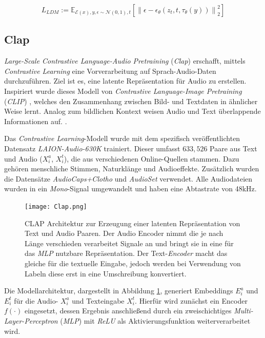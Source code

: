 \documentclass[
  a4paper,  %
  twoside,  %
  bibliography=totoc,
  headsepline,
  cleardoublepage=empty,
  parskip=half,
  draft=false
]{scrbook}
\begin{document}
\begin{equation}
L_{L D M}:=\mathbb{E}_{\mathcal{E}(x), y, \epsilon \sim \mathcal{N}(0,1), t}\left[\left\|\epsilon-\epsilon_\theta\left(z_t, t, \tau_\theta(y)\right)\right\|_2^2\right]
\end{equation}

\subsection{Clap}

\emph{Large-Scale Contrastive Language-Audio Pretraining} (\emph{Clap}) \cite{wu_large-scale_2023} erschafft, mittels \emph{Contrastive Learning} eine Vorverarbeitung auf Sprach-Audio-Daten durchzuführen. Ziel ist es, eine latente Repräsentation für Audio zu erstellen. Inspiriert wurde dieses Modell von \emph{Contrastive Language-Image Pretraining} (\emph{CLIP}) \cite{radford_learning_2021}, welches den Zusammenhang zwischen Bild- und Textdaten in ähnlicher Weise lernt. Analog zum bildlichen Kontext weisen Audio und Text überlappende Informationen auf. \cite{wu_large-scale_2023}.

Das \emph{Contrastive Learning}-Modell wurde mit dem spezifisch veröffentlichten Datensatz \emph{LAION-Audio-630K} trainiert. Dieser umfasst $633,526$ Paare aus Text und Audio ($X_i^a$, $X_i^t$), die aus verschiedenen Online-Quellen stammen. Dazu gehören menschliche Stimmen, Naturklänge und Audioeffekte. Zusätzlich wurden die Datensätze \emph{AudioCaps+Clotho} \cite{kim_audiocaps_2019} \cite{drossos_clotho_2019} und \emph{AudioSet} \cite{gemmeke_audio_2017} verwendet. Alle Audiodateien wurden in ein \emph{Mono}-Signal umgewandelt und haben eine Abtastrate von 48kHz. \cite{wu_large-scale_2023}

\begin{figure}[h]
  \centering
  \texttt{[image: Clap.png]}
  \caption[Clap Architektur]{CLAP Architektur zur Erzeugung einer latenten Repräsentation von Text und Audio Paaren. Der Audio Encoder nimmt die je nach Länge verschieden verarbeitet Signale an und bringt sie in eine für das \emph{MLP} nutzbare Repräsentation. Der Text-\emph{Encoder} macht das gleiche für die textuelle Eingabe, jedoch werden bei Verwendung von Labeln diese erst in eine Umschreibung konvertiert.\cite{wu_large-scale_2023}}
  \label{fig:Clap}
\end{figure} 

Die Modellarchitektur, dargestellt in Abbildung \ref{fig:Clap}, generiert Embeddings $E_i^a$ und $E_i^t$ für die Audio- $X_i^a$ und Texteingabe $X_i^t$. Hierfür wird zunächst ein Encoder $f(\cdot)$ eingesetzt, dessen Ergebnis anschließend durch ein zweischichtiges \emph{Multi-Layer-Perceptron} (\emph{MLP}) mit \emph{ReLU} \cite{agarap_deep_2019} als Aktivierungsfunktion weiterverarbeitet wird. \cite{wu_large-scale_2023}
\end{document}
